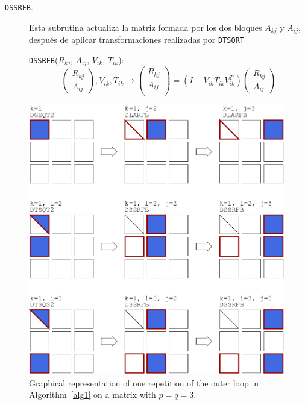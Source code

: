 \documentclass[12pt]{article}
\begin{document}
\begin{description}
\item[\texttt{DSSRFB}.] Esta subrutina actualiza la matriz formada por los dos bloques $A_{kj}$ y $A_{ij}$, después de aplicar transformaciones realizadas por \texttt{DTSQRT} 
  
  \texttt{DSSRFB}($R_{kj}$, $A_{ij}$, $V_{ik}$, $T_{ik}$):
  \begin{displaymath}
    \left(\begin{array}{c}
      R_{kj}\\
      A_{ij}
    \end{array}\right), V_{ik}, T_{ik} \longrightarrow
    \left(
    \begin{array}{c}
      R_{kj}\\
      A_{ij}\\
    \end{array}\right)=
    (I - V_{ik}T_{ik} V^T_{ik})\left(\begin{array}{c}
      R_{kj}\\
      A_{ij}
    \end{array}\right)
  \end{displaymath}
  
\end{description}


\clearpage

\begin{figure}[!h]
  \begin{center}
    \includegraphics[width=\textwidth]{images/blk_alg_col.pdf}
  \caption{\label{fig:blk_alg}Graphical representation of one     repetition of the outer loop in Algorithm~\ref{alg1} on a matrix with $p=q=3$.
}
  \end{center}
\end{figure}
\end{document}
